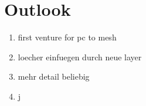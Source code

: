 \chapter{Outlook}
\label{sec:outlook}
\begin{enumerate}
    \item first venture for pc to mesh
    \item loecher einfuegen durch neue layer
    \item mehr detail beliebig
    \item j
\end{enumerate}